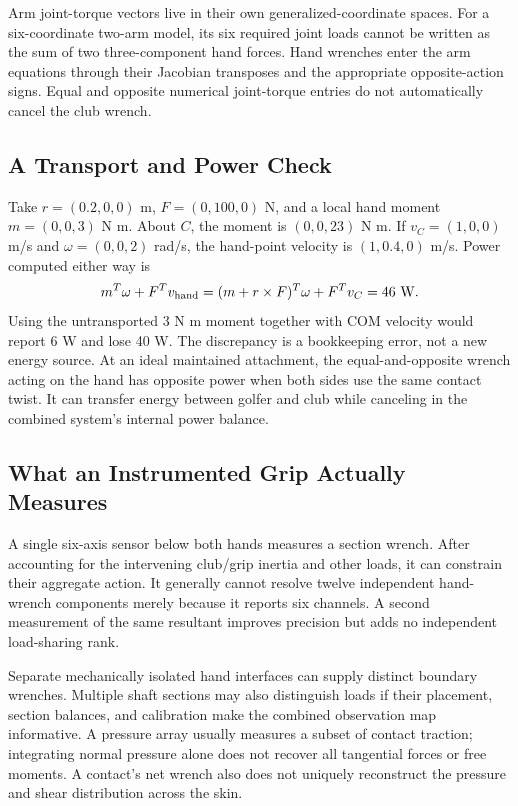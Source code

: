Arm joint-torque vectors live in their own generalized-coordinate spaces.
For a six-coordinate two-arm model, its six required joint loads cannot be
written as the sum of two three-component hand forces. Hand wrenches enter the
arm equations through their Jacobian transposes and the appropriate
opposite-action signs. Equal and opposite numerical joint-torque entries do
not automatically cancel the club wrench.

\subsection{A Transport and Power Check}

Take $r=(0.2,0,0)$ m, $F=(0,100,0)$ N, and a local hand moment
$m=(0,0,3)$ N m. About $C$, the moment is $(0,0,23)$ N m. If
$v_C=(1,0,0)$ m/s and $\omega=(0,0,2)$ rad/s, the hand-point velocity is
$(1,0.4,0)$ m/s. Power computed either way is
\begin{equation}
 m^T\omega+F^Tv_{\rm hand}
 =(m+r\times F)^T\omega+F^Tv_C=46\ {\rm W}.
 \label{eq:wrench_power_example}
\end{equation}
Using the untransported 3 N m moment together with COM velocity would report
6 W and lose 40 W. The discrepancy is a bookkeeping error, not a new energy
source. At an ideal maintained attachment, the equal-and-opposite wrench acting
on the hand has opposite power when both sides use the same contact twist.
It can transfer energy between golfer and club while canceling in the combined
system's internal power balance.

\subsection{What an Instrumented Grip Actually Measures}

A single six-axis sensor below both hands measures a section wrench. After
accounting for the intervening club/grip inertia and other loads, it can
constrain their aggregate action. It generally cannot resolve twelve independent
hand-wrench components merely because it reports six channels. A second
measurement of the same resultant improves precision but adds no independent
load-sharing rank.

Separate mechanically isolated hand interfaces can supply distinct boundary
wrenches. Multiple shaft sections may also distinguish loads if their placement,
section balances, and calibration make the combined observation map informative.
A pressure array usually measures a subset of contact traction; integrating
normal pressure alone does not recover all tangential forces or free moments.
A contact's net wrench also does not uniquely reconstruct the pressure and shear
distribution across the skin.

